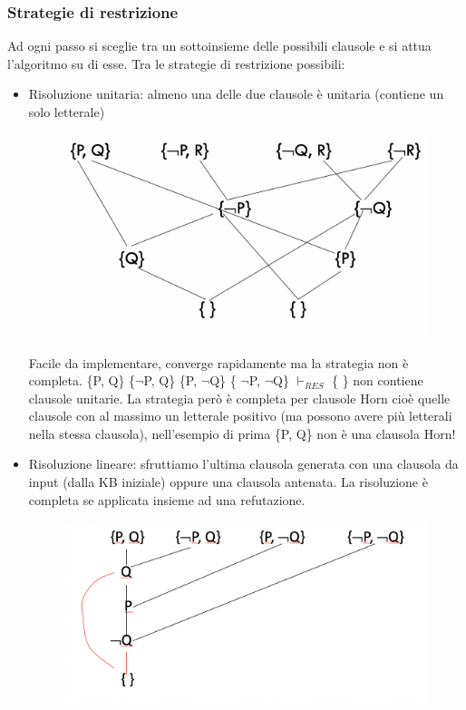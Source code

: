 \documentclass{article}
\begin{document}
\subsubsection{Strategie di restrizione}
Ad ogni passo si sceglie tra un sottoinsieme delle possibili clausole e si attua l'algoritmo su di esse. Tra le strategie di restrizione possibili:
\begin{itemize}
    \item Risoluzione unitaria: almeno una delle due clausole è unitaria (contiene un solo letterale)
        \begin{figure}[H]
        \centering
        \includegraphics[scale=0.45]{Images/risoluzioneunitaria.png}
        \end{figure}
        Facile da implementare, converge rapidamente ma la strategia non è completa. \newline 
        \{P, Q\} \{$\neg$P, Q\} \{P, $\neg$Q\} \{ $\neg$P, $\neg$Q\} $\vdash _{RES}$ \{ \} non contiene clausole unitarie. \newline
        La strategia però è completa per clausole Horn cioè quelle clausole con al massimo un letterale positivo (ma possono avere più letterali nella stessa clausola), nell'esempio di prima \{P, Q\} non è una clausola Horn!
    \item Risoluzione lineare: sfruttiamo l'ultima clausola generata con una clausola da input (dalla KB iniziale) oppure una clausola antenata. La risoluzione è completa se applicata insieme ad una refutazione.
        \begin{figure}[H]
        \centering
        \includegraphics[scale=0.4]{Images/risoluzionelineare.png}

\end{figure}
\end{itemize}
\end{document}
